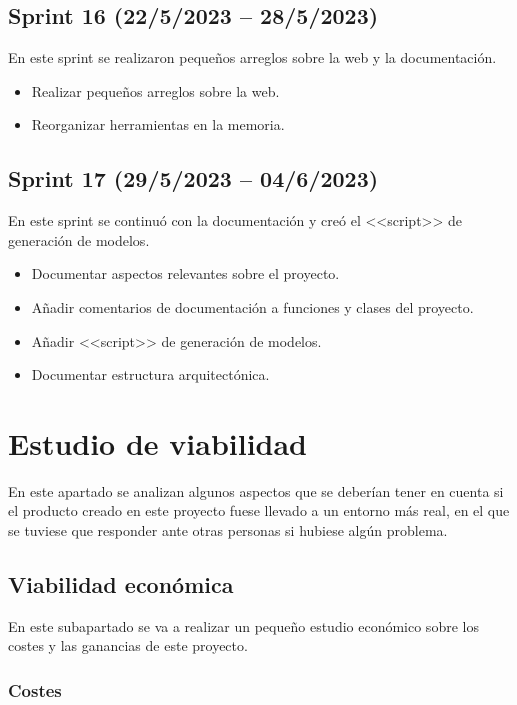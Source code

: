 \subsection{Sprint 16 (22/5/2023 -- 28/5/2023)}

En este sprint se realizaron pequeños arreglos sobre la web y la documentación.

\begin{itemize}
    \item Realizar pequeños arreglos sobre la web.
    \item Reorganizar herramientas en la memoria.
\end{itemize}

\subsection{Sprint 17 (29/5/2023 -- 04/6/2023)}

En este sprint se continuó con la documentación y creó el <<script>> de
generación de modelos.

\begin{itemize}
    \item Documentar aspectos relevantes sobre el proyecto.
    \item Añadir comentarios de documentación a funciones y clases del proyecto.
    \item Añadir <<script>> de generación de modelos.
    \item Documentar estructura arquitectónica.
\end{itemize}

\section{Estudio de viabilidad}

En este apartado se analizan algunos aspectos que se deberían tener en cuenta si
el producto creado en este proyecto fuese llevado a un entorno más real, en el
que se tuviese que responder ante otras personas si hubiese algún problema.

\subsection{Viabilidad económica}

En este subapartado se va a realizar un pequeño estudio económico sobre los
costes y las ganancias de este proyecto.

\subsubsection{Costes}

